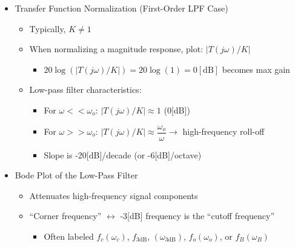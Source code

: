 \begin{itemize}
  \item Transfer Function Normalization (First-Order LPF Case)

    \begin{itemize}

      \item Typically, $K\neq1$

      \item When normalizing a magnitude response, plot: $|T(j\omega)/K|$

        \begin{itemize}

          \item $20\log(|T(j\omega)/K|)=20\log(1)=0[\text{dB}]$ becomes max gain

        \end{itemize}

      \item Low-pass filter characteristics:

        \begin{itemize}

          \item For $\omega <<\omega_o$: $|T(j\omega)/K|\approx 1$ (0[dB])

          \item For $\omega >>\omega_o$: $|T(j\omega)/K|\approx \dfrac{\omega_o}{\omega}\to$ high-frequency roll-off

          \item Slope is -20[dB]/decade (or -6[dB]/octave)

        \end{itemize}

    \end{itemize}

  \item Bode Plot of the Low-Pass Filter

    \begin{itemize}

      \item Attenuates high-frequency signal components

      \item ``Corner frequency'' $\leftrightarrow$ -3[dB] frequency is the ``cutoff frequency''

        \begin{itemize}

          \item Often labeled $f_c(\omega_c)$, $f_{3\text{dB}}$, $(\omega_{3\text{dB}})$, $f_o(\omega_o)$, or $f_B(\omega_B)$


\end{itemize}
\end{itemize}
\end{itemize}

